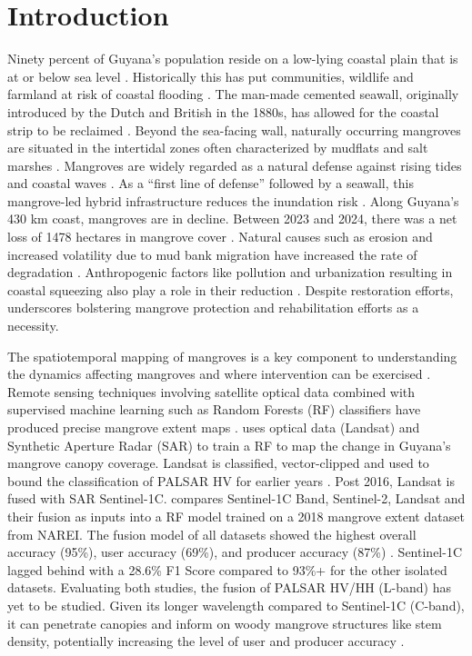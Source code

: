 \documentclass[project-plan]{report-template}
\begin{document}
\section{Introduction}
Ninety percent of Guyana’s population reside on a low-lying coastal plain that is at or below sea level \parencite{Oyedotun2025, Pelling1999}. Historically this has put communities, wildlife and farmland at risk of coastal flooding \parencite{Lakhan1994}. The man-made cemented seawall, originally introduced by the Dutch and British in the 1880s, has allowed for the coastal strip to be reclaimed \parencite{Bassett2013}. Beyond the sea-facing wall, naturally occurring mangroves are situated in the intertidal zones often characterized by mudflats and salt marshes \parencite{Best2022}. Mangroves are widely regarded as a natural defense against rising tides and coastal waves \parencite{Hernandez2024, Van2023, Blankespoor2017}. As a “first line of defense” followed by a seawall, this mangrove-led hybrid infrastructure reduces the inundation risk \parencite{De2023}. Along Guyana’s 430 km coast, mangroves are in decline. Between 2023 and 2024, there was a net loss of 1478 hectares in mangrove cover \parencite{Narei2024}. Natural causes such as erosion and increased volatility due to mud bank migration have increased the rate of degradation \parencite{Dookie2022}. Anthropogenic factors like pollution and urbanization resulting in coastal squeezing also play a role in their reduction \parencite{Johnson2018}. Despite restoration efforts, \textcite{Narei2024} underscores bolstering mangrove protection and rehabilitation efforts as a necessity.
\vspace{5 mm}

The spatiotemporal mapping of mangroves is a key component to understanding the dynamics affecting mangroves and where intervention can be exercised \parencite{Pimple2025, Spalding2014}. Remote sensing techniques involving satellite optical data combined with supervised machine learning such as Random Forests (RF) classifiers have produced precise mangrove extent maps \parencite{Fallatah2026, Elmahdy2020}. \textcite{Nedd2023} uses optical data (Landsat) and Synthetic Aperture Radar (SAR) to train a RF to map the change in Guyana’s mangrove canopy coverage. Landsat is classified, vector-clipped and used to bound the classification of PALSAR HV for earlier years \parencite{Nedd2023}. Post 2016, Landsat is fused with SAR Sentinel-1C. \textcite{Chan2024} compares Sentinel-1C Band, Sentinel-2, Landsat and their fusion as inputs into a RF model trained on a 2018 mangrove extent dataset from NAREI. The fusion model of all datasets showed the highest overall accuracy (95\%), user accuracy (69\%), and producer accuracy (87\%) \parencite{Chan2024}. Sentinel-1C lagged behind with a 28.6\% F1 Score compared to 93\%+ for the other isolated datasets. Evaluating both studies, the fusion of PALSAR HV/HH (L-band) has yet to be studied. Given its longer wavelength compared to Sentinel-1C (C-band), it can penetrate canopies and inform on woody mangrove structures like stem density, potentially increasing the level of user and producer accuracy \parencite{Saatchi2019}.
\vspace{5 mm}
\end{document}
